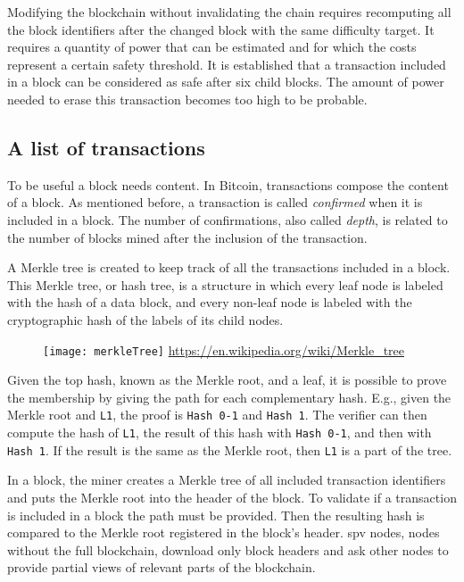 Modifying the blockchain without invalidating the chain requires recomputing all
the block identifiers after the changed block with the same difficulty target. It requires a quantity of power
that can be estimated and for which the costs represent a certain safety
threshold. It is established that a transaction included in a block can be
considered as safe after six child blocks. The amount of power needed to erase
this transaction becomes too high to be probable.

\subsection{A list of transactions}

To be useful a block needs content. In Bitcoin, transactions compose the
content of a block. As mentioned before, a transaction is called
\textit{confirmed} when it is included in a block. The number of confirmations,
also called \textit{depth}, is related to the number of blocks mined after the
inclusion of the transaction.

A Merkle tree is created to keep track of all the transactions included in a
block. This Merkle tree, or hash tree, is a structure in which every leaf
node is labeled with the hash of a data block, and every non-leaf node is
labeled with the cryptographic hash of the labels of its child nodes.

\begin{figure}[H]
	\centering
	\texttt{[image: merkleTree]}
	{\url{https://en.wikipedia.org/wiki/Merkle_tree}}
	\label{fig:merkleTree}
\end{figure}

Given the top hash, known as the Merkle root, and a leaf, it is possible to prove the
membership by giving the path for each complementary hash. E.g., given the
Merkle root and \texttt{L1}, the proof is \texttt{Hash 0-1} and \texttt{Hash 1}.
The verifier can then compute the hash of \texttt{L1}, the result of this hash
with \texttt{Hash 0-1}, and then with \texttt{Hash 1}. If the result is the same
as the Merkle root, then \texttt{L1} is a part of the tree.

In a block, the miner creates a Merkle tree of all included transaction
identifiers and puts the Merkle root into the header of the block. To validate
if a transaction is included in a block the path must be provided. Then the
resulting hash is compared to the Merkle root registered in the block's header.
\gls{spv} nodes, nodes without the full blockchain, download only block headers
and ask other nodes to provide partial views of relevant parts of the blockchain.

